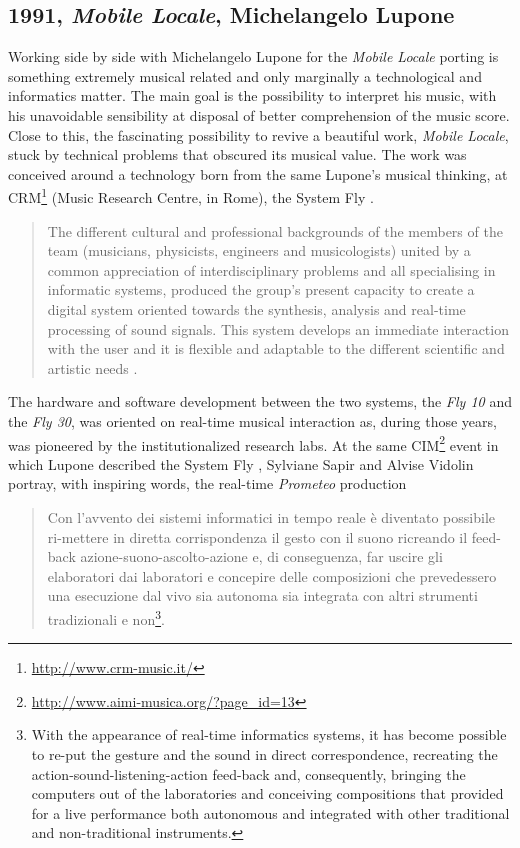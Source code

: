\documentclass[twoside,a4paper]{article}
\begin{document}
\subsection{1991, \emph{Mobile Locale}, Michelangelo Lupone}

Working side by side with Michelangelo Lupone for the \emph{Mobile Locale} \cite{lmml91} porting is something extremely musical related and only marginally a technological and informatics matter. The main goal is the possibility to interpret his music, with his unavoidable sensibility at disposal of better comprehension of the music score. Close to this, the fascinating possibility to revive a beautiful work, \emph{Mobile Locale}, stuck by technical problems that obscured its musical value. The work was conceived around a technology born from the same Lupone's musical thinking, at CRM\footnote{\url{http://www.crm-music.it/}} (Music Research Centre, in Rome), the System Fly \cite{ml85}.


\begin{quote}
The different cultural and professional backgrounds of the members of the team (musicians, physicists, engineers and musicologists) united by a common appreciation of interdisciplinary problems and all specialising in informatic systems, produced the group's present capacity to create a digital system oriented towards the synthesis, analysis and real-time processing of sound signals. This system develops an immediate interaction with the user and it is flexible and adaptable to the different scientific and artistic needs \cite{ml91}.
\end{quote}

The hardware and software development between the two systems, the \emph{Fly 10} and the \emph{Fly 30}, was oriented on real-time musical interaction as, during those years, was pioneered by the institutionalized research labs. At the same CIM\footnote{\url{http://www.aimi-musica.org/?page_id=13}} event in which Lupone described the System Fly \cite{ml85},  Sylviane Sapir and Alvise Vidolin \cite{savi85} portray, with inspiring words, the real-time \emph{Prometeo} production

\begin{quote}
Con l'avvento dei sistemi informatici in tempo reale è diventato possibile ri-mettere in diretta corrispondenza il gesto con il suono ricreando il feed-back azione-suono-ascolto-azione e, di conseguenza, far uscire gli elaboratori dai laboratori e concepire delle composizioni che prevedessero una esecuzione dal vivo sia autonoma sia integrata con altri strumenti tradizionali e non\footnote{With the appearance of real-time informatics systems, it has become possible to re-put the gesture and the sound in direct correspondence, recreating the action-sound-listening-action feed-back and, consequently, bringing the computers out of the laboratories and conceiving compositions that provided for a live performance both autonomous and integrated with other traditional and non-traditional instruments.}.
\end{quote}
\end{document}
